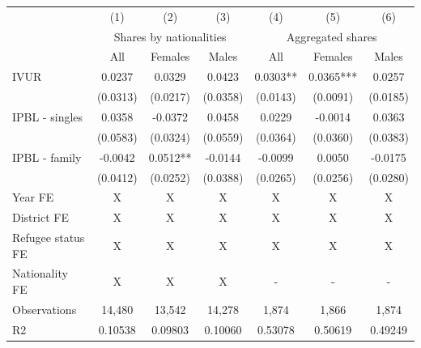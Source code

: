 \centering
\begin{tabular}{lcccccc}
\hline
            & (1) & (2) & (3)  & (4) & (5) & (6)  \\
            & \multicolumn{3}{c}{Shares by nationalities} & \multicolumn{3}{c}{Aggregated shares} \\
            & All & Females & Males & All & Females & Males \\ \hline
IVUR            & 0.0237  & 0.0329  &  0.0423 & 0.0303** &  0.0365*** & 0.0257  \\
                & (0.0313) & (0.0217) & (0.0358) & (0.0143) &  (0.0091) &(0.0185) \\
IPBL - singles & 0.0358  & -0.0372 & 0.0458 & 0.0229 & -0.0014 & 0.0363  \\
               & (0.0583) & (0.0324) &   (0.0559) & (0.0364) & (0.0360) &(0.0383) \\
IPBL - family &  -0.0042  & 0.0512** &  -0.0144 & -0.0099 & 0.0050 & -0.0175 \\
               & (0.0412) & (0.0252) &  (0.0388) &  (0.0265) &  (0.0256) & (0.0280) \\ \hline
Year FE & X & X  & X& X& X& X\\
District FE & X & X  & X& X& X& X\\
Refugee status FE  & X & X  & X& X& X& X\\
Nationality FE & X & X  & X& -&- &-  \\
Observations  &    14,480 &    13,542      & 14,278 & 1,874 & 1,866 & 1,874 \\  
R2              & 0.10538 &  0.09803 & 0.10060 & 0.53078 & 0.50619 & 0.49249\\
\hline


\end{tabular}